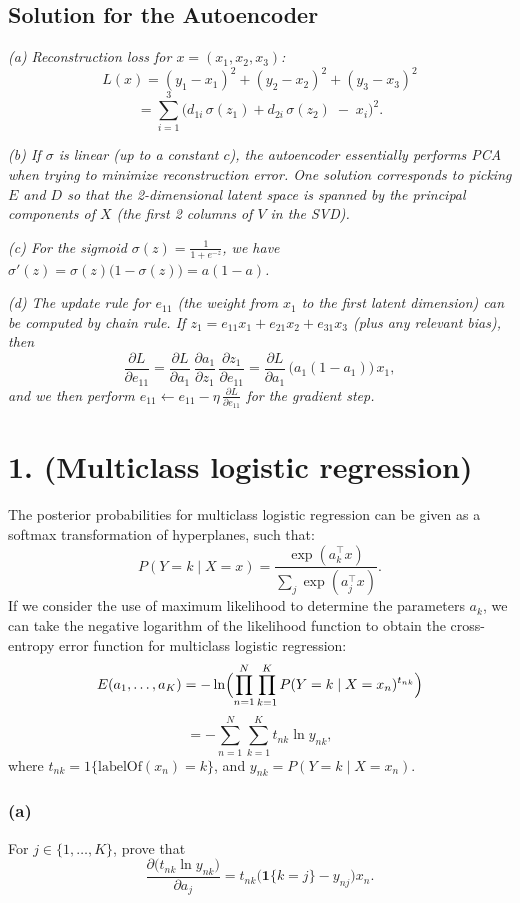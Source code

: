 \documentclass[twocolumn]{article}
\begin{document}
\begin{spacing}{1}
\subsection*{Solution for the Autoencoder}

\noindent
\emph{(a) Reconstruction loss for $x=(x_1,x_2,x_3)$:}
\[
L(x) = (y_1 - x_1)^2 + (y_2 - x_2)^2 + (y_3 - x_3)^2
\]
\[
=
\sum_{i=1}^3 \bigl(d_{1i}\,\sigma(z_1) + d_{2i}\,\sigma(z_2)\;-\;x_i\bigr)^{2}.
\]

\noindent
\emph{(b) If $\sigma$ is linear (up to a constant $c$), the autoencoder essentially performs PCA when trying
to minimize reconstruction error. One solution corresponds to picking $E$ and $D$ so that the 2-dimensional
latent space is spanned by the principal components of $X$ (the first 2 columns of $V$ in the SVD).}

\noindent
\emph{(c) For the sigmoid $\sigma(z)=\frac{1}{1+e^{-z}}$, we have $\sigma'(z)=\sigma(z)\bigl(1-\sigma(z)\bigr)=a(1-a)$.}

\noindent
\emph{(d) The update rule for $e_{11}$ (the weight from $x_1$ to the first latent dimension) can be computed
by chain rule. If $z_1 = e_{11} x_1 + e_{21} x_2 + e_{31} x_3$ (plus any relevant bias), then
\[
\frac{\partial L}{\partial e_{11}}
= \frac{\partial L}{\partial a_1}\,\frac{\partial a_1}{\partial z_1}\,\frac{\partial z_1}{\partial e_{11}}
= \frac{\partial L}{\partial a_1}\,\bigl(a_1(1-a_1)\bigr)\,x_1,
\]
and we then perform $e_{11}\leftarrow e_{11} - \eta \,\frac{\partial L}{\partial e_{11}}$ for the gradient step.}


\section{1. (Multiclass logistic regression)}
The posterior probabilities for multiclass logistic regression can be given as a softmax transformation of hyperplanes, such that:
\[
P(Y = k \mid X = x)
= \frac{\exp(a_k^\top x)}{\sum_{j} \exp(a_j^\top x)}.
\]
If we consider the use of maximum likelihood to determine the parameters $a_k$, we can take the negative logarithm of the likelihood function to obtain the cross-entropy error function for multiclass logistic regression:
\[
E(a_1, \dots, a_K)
= -\ln \Bigl(\prod_{n=1}^N\prod_{k=1}^K P(Y = k \mid X = x_n)^{t_{nk}}\Bigr)
\]
\[
= -\sum_{n=1}^N \sum_{k=1}^K t_{nk} \ln y_{nk},
\]
where $t_{nk} = 1\{\text{labelOf}(x_n) = k\}$, and $y_{nk} = P(Y = k \mid X = x_n)$.

\subsubsection{(a)}
For $j \in \{1, \dots, K\}$, prove that
\[
\frac{\partial \bigl(t_{nk} \ln y_{nk}\bigr)}{\partial a_j}
= t_{nk} \bigl(\mathbf{1}\{k = j\} - y_{nj}\bigr)x_n.
\]


\end{spacing}
\end{document}
